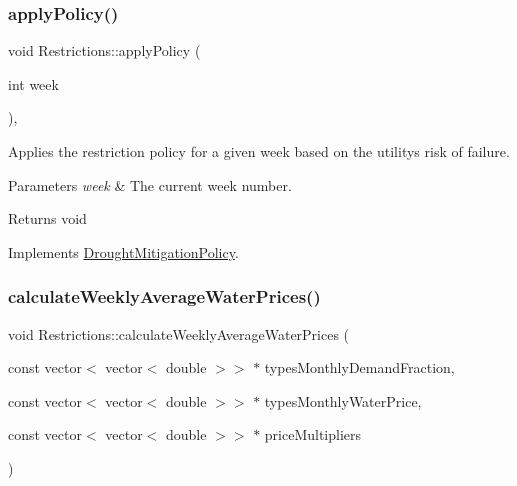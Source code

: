 \subsubsection{\texorpdfstring{apply\+Policy()}{applyPolicy()}}
{\footnotesize\ttfamily void Restrictions\+::apply\+Policy (\begin{DoxyParamCaption}\item[{int}]{week }\end{DoxyParamCaption})\hspace{0.3cm}{\ttfamily [override]}, {\ttfamily [virtual]}}



Applies the restriction policy for a given week based on the utility\textquotesingle{}s risk of failure. 


\begin{DoxyParams}{Parameters}
{\em week} & The current week number.\\
\hline
\end{DoxyParams}
\begin{DoxyReturn}{Returns}
void 
\end{DoxyReturn}


Implements \mbox{\hyperlink{classDroughtMitigationPolicy_a76c1a85eaf7707306fe173b6437cc31d}{Drought\+Mitigation\+Policy}}.

\mbox{\label{classRestrictions_a5155dcecc8b995c1793fa400f1533959}} 
\subsubsection{\texorpdfstring{calculate\+Weekly\+Average\+Water\+Prices()}{calculateWeeklyAverageWaterPrices()}}
{\footnotesize\ttfamily void Restrictions\+::calculate\+Weekly\+Average\+Water\+Prices (\begin{DoxyParamCaption}\item[{const vector$<$ vector$<$ double $>$$>$ $\ast$}]{types\+Monthly\+Demand\+Fraction,  }\item[{const vector$<$ vector$<$ double $>$$>$ $\ast$}]{types\+Monthly\+Water\+Price,  }\item[{const vector$<$ vector$<$ double $>$$>$ $\ast$}]{price\+Multipliers }\end{DoxyParamCaption})}



